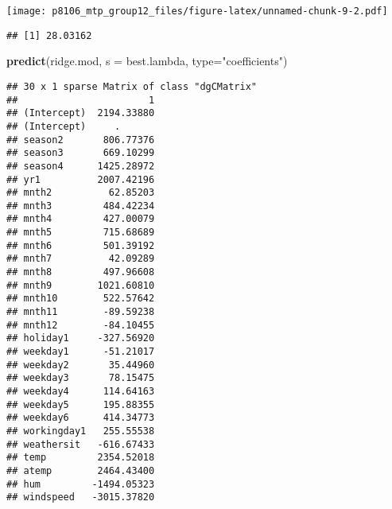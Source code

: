 \documentclass[]{article}
\newenvironment{Shaded}{\begin{snugshade}}{\end{snugshade}}
\newcommand{\KeywordTok}[1]{\textcolor[rgb]{0.13,0.29,0.53}{\textbf{#1}}}
\newcommand{\DataTypeTok}[1]{\textcolor[rgb]{0.13,0.29,0.53}{#1}}
\newcommand{\DecValTok}[1]{\textcolor[rgb]{0.00,0.00,0.81}{#1}}
\newcommand{\StringTok}[1]{\textcolor[rgb]{0.31,0.60,0.02}{#1}}
\newcommand{\OperatorTok}[1]{\textcolor[rgb]{0.81,0.36,0.00}{\textbf{#1}}}
\newcommand{\NormalTok}[1]{#1}
\begin{document}
\texttt{[image: p8106\_mtp\_group12\_files/figure-latex/unnamed-chunk-9-2.pdf]}

\begin{Shaded}
\end{Shaded}

\begin{verbatim}
## [1] 28.03162
\end{verbatim}

\begin{Shaded}
\begin{Highlighting}[]
\KeywordTok{predict}\NormalTok{(ridge.mod, }\DataTypeTok{s =}\NormalTok{ best.lambda, }\DataTypeTok{type=}\StringTok{"coefficients"}\NormalTok{)}
\end{Highlighting}
\end{Shaded}

\begin{verbatim}
## 30 x 1 sparse Matrix of class "dgCMatrix"
##                       1
## (Intercept)  2194.33880
## (Intercept)     .      
## season2       806.77376
## season3       669.10299
## season4      1425.28972
## yr1          2007.42196
## mnth2          62.85203
## mnth3         484.42234
## mnth4         427.00079
## mnth5         715.68689
## mnth6         501.39192
## mnth7          42.09289
## mnth8         497.96608
## mnth9        1021.60810
## mnth10        522.57642
## mnth11        -89.59238
## mnth12        -84.10455
## holiday1     -327.56920
## weekday1      -51.21017
## weekday2       35.44960
## weekday3       78.15475
## weekday4      114.64163
## weekday5      195.88355
## weekday6      414.34773
## workingday1   255.55538
## weathersit   -616.67433
## temp         2354.52018
## atemp        2464.43400
## hum         -1494.05323
## windspeed   -3015.37820
\end{verbatim}

\begin{Shaded}
\end{Shaded}
\end{document}
